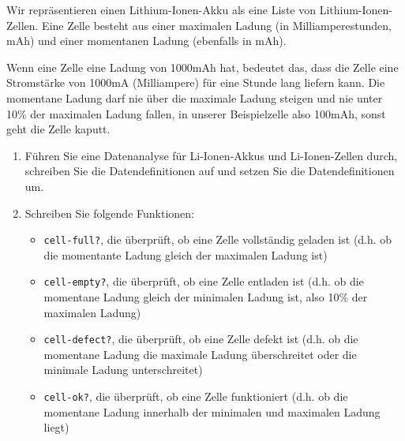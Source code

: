 \begin{aufgabe}
  Wir repräsentieren einen Lithium-Ionen-Akku als
  eine Liste von Lithium-Ionen-Zellen.  Eine Zelle besteht aus einer
  maximalen Ladung (in Milliamperestunden, mAh) und einer momentanen
  Ladung (ebenfalls in mAh).

  Wenn eine Zelle eine Ladung von 1000mAh hat, bedeutet das, dass die
  Zelle eine Stromstärke von 1000mA (Milliampere) für eine Stunde lang
  liefern kann.  Die momentane Ladung darf nie über die maximale
  Ladung steigen und nie unter 10\% der maximalen Ladung fallen, in
  unserer Beispielzelle also 100mAh, sonst geht die Zelle kaputt.

  
  \begin{enumerate}
    \setlength{\itemsep}{1cm}
  \item Führen Sie eine Datenanalyse für Li-Ionen-Akkus und
    Li-Ionen-Zellen durch, schreiben Sie die Datendefinitionen auf und
    setzen Sie die Datendefinitionen um.

  \item Schreiben Sie folgende Funktionen:

    \begin{itemize}
    \item \texttt{cell-full?}, die überprüft, ob eine
      Zelle vollständig geladen ist (d.h. ob die momentante
      Ladung gleich der maximalen Ladung ist)

    \item \texttt{cell-empty?}, die überprüft, ob eine Zelle entladen
      ist (d.h. ob die momentane Ladung gleich der minimalen Ladung
      ist, also 10\% der maximalen Ladung)

    \item \texttt{cell-defect?}, die überprüft, ob eine
      Zelle defekt ist (d.h. ob die momentane Ladung die
      maximale Ladung überschreitet oder die minimale Ladung
      unterschreitet)

    \item \texttt{cell-ok?}, die überprüft, ob eine
      Zelle funktioniert (d.h. ob die momentane Ladung
      innerhalb der minimalen und maximalen Ladung liegt)

    \end{itemize}


\end{enumerate}
\end{aufgabe}
